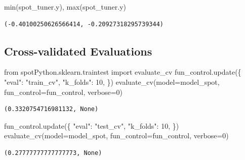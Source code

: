 \documentclass[
  letterpaper,
  DIV=11,
  numbers=noendperiod]{scrreprt}
\newenvironment{Shaded}{\begin{snugshade}}{\end{snugshade}}
\newcommand{\BuiltInTok}[1]{\textcolor[rgb]{0.00,0.23,0.31}{#1}}
\newcommand{\DecValTok}[1]{\textcolor[rgb]{0.68,0.00,0.00}{#1}}
\newcommand{\ImportTok}[1]{\textcolor[rgb]{0.00,0.46,0.62}{#1}}
\newcommand{\NormalTok}[1]{\textcolor[rgb]{0.00,0.23,0.31}{#1}}
\newcommand{\OperatorTok}[1]{\textcolor[rgb]{0.37,0.37,0.37}{#1}}
\newcommand{\StringTok}[1]{\textcolor[rgb]{0.13,0.47,0.30}{#1}}
\begin{document}
\begin{Shaded}
\begin{Highlighting}[]
\BuiltInTok{min}\NormalTok{(spot\_tuner.y), }\BuiltInTok{max}\NormalTok{(spot\_tuner.y)}
\end{Highlighting}
\end{Shaded}

\begin{verbatim}
(-0.40100250626566414, -0.20927318295739344)
\end{verbatim}

\hypertarget{cross-validated-evaluations-1}{%
\subsection{Cross-validated
Evaluations}\label{cross-validated-evaluations-1}}

\begin{Shaded}
\begin{Highlighting}[]
\ImportTok{from}\NormalTok{ spotPython.sklearn.traintest }\ImportTok{import}\NormalTok{ evaluate\_cv}
\NormalTok{fun\_control.update(\{}
     \StringTok{"eval"}\NormalTok{: }\StringTok{"train\_cv"}\NormalTok{,}
     \StringTok{"k\_folds"}\NormalTok{: }\DecValTok{10}\NormalTok{,}
\NormalTok{\})}
\NormalTok{evaluate\_cv(model}\OperatorTok{=}\NormalTok{model\_spot, fun\_control}\OperatorTok{=}\NormalTok{fun\_control, verbose}\OperatorTok{=}\DecValTok{0}\NormalTok{)}
\end{Highlighting}
\end{Shaded}

\begin{verbatim}
(0.3320754716981132, None)
\end{verbatim}

\begin{Shaded}
\begin{Highlighting}[]
\NormalTok{fun\_control.update(\{}
     \StringTok{"eval"}\NormalTok{: }\StringTok{"test\_cv"}\NormalTok{,}
     \StringTok{"k\_folds"}\NormalTok{: }\DecValTok{10}\NormalTok{,}
\NormalTok{\})}
\NormalTok{evaluate\_cv(model}\OperatorTok{=}\NormalTok{model\_spot, fun\_control}\OperatorTok{=}\NormalTok{fun\_control, verbose}\OperatorTok{=}\DecValTok{0}\NormalTok{)}
\end{Highlighting}
\end{Shaded}

\begin{verbatim}
(0.27777777777777773, None)
\end{verbatim}
\end{document}
